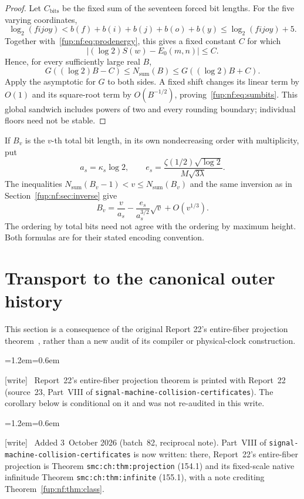 \documentclass[11pt,letterpaper]{article}
\theoremstyle{definition}\newtheorem{definition}[theorem]{Definition}
\theoremstyle{remark}\newtheorem{remark}[theorem]{Remark}
\newcommand{\wtag}{\textup{[write]}}
\newenvironment{writenote}{\par\smallskip\begin{list}{}{\leftmargin=1.2em\rightmargin=0.6em}\item[]\small\wtag\ }{\end{list}\smallskip}
\newcommand{\rw}[1]{\nolinkurl{#1}}%
\begin{document}
\begin{proof}
Let $C_{\mathrm{bits}}$ be the fixed sum of the seventeen forced bit lengths. For the five varying coordinates,
\[
 \log_2(fijoy)<b(f)+b(i)+b(j)+b(o)+b(y)
                    \le\log_2(fijoy)+5.
\]
Together with~\eqref{fup:nf:eq:prodenergy}, this gives a fixed constant $C$ for which
\[
 |(\log2)S(w)-E_0(m,n)|\le C.
\]
Hence, for every sufficiently large real $B$,
\[
 G((\log2)B-C)\le N_{\mathrm{sum}}(B)
                 \le G((\log2)B+C).
\]
Apply the asymptotic for $G$ to both sides. A fixed shift changes its linear term by $O(1)$ and its square-root term by $O(B^{-1/2})$, proving~\eqref{fup:nf:eq:sumbits}. This global sandwich includes powers of two and every rounding boundary; individual floors need not be stable.
\end{proof}

If $B_v$ is the $v$-th total bit length, in its own nondecreasing order with multiplicity, put
\[
 a_s=\kappa_s\log2,\qquad e_s=\frac{\zeta(1/2)\sqrt{\log2}}{M\sqrt{3\lambda}}.
\]
The inequalities $N_{\mathrm{sum}}(B_v-1)<v\le N_{\mathrm{sum}}(B_v)$ and the same inversion as in Section~\ref{fup:nf:sec:inverse} give
\[
 B_v=\frac v{a_s}-\frac{e_s}{a_s^{3/2}}\sqrt v+O(v^{1/3}).
\]
The ordering by total bits need not agree with the ordering by maximum height. Both formulas are for their stated encoding convention.

\section{Transport to the canonical outer history}\label{fup:nf:sec:transport}
This section is a consequence of the original Report 22's entire-fiber projection theorem~\cite{fup:nf:report22}, rather than a new audit of its compiler or physical-clock construction.
\begin{writenote}
Report~22's entire-fiber projection theorem is printed with Report~22 (source~23, Part~VIII of \rw{signal-machine-collision-certificates}). The corollary below is conditional on it and was not re-audited in this write.
\end{writenote}
\begin{writenote}
Added 3~October 2026 (batch~82, reciprocal note). Part~VIII of \rw{signal-machine-collision-certificates} is now written: there, Report~22's entire-fiber projection is Theorem \rw{smc:ch:thm:projection} (154.1) and its fixed-scale native infinitude Theorem \rw{smc:ch:thm:infinite} (155.1), with a note crediting Theorem~\ref{fup:nf:thm:class}.
\end{writenote}
\end{document}
